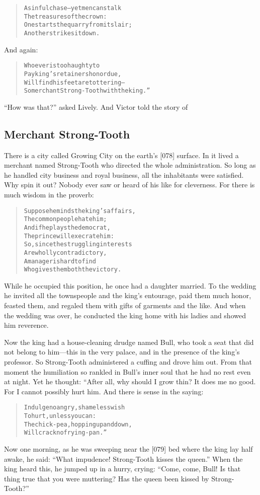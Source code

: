 \documentclass[article, twoside, 14pt]{memoir}
\renewenvironment{verbatim}{%
\begin{quote}%
\vskip -10pt%
\begin{alltt}\normalfont\large}{\end{alltt}%
\end{quote}%
\vskip -10pt
} %
\begin{document}
\begin{verbatim}
A sinful chase--yet men can stalk
    The treasures of the crown:
One starts the quarry from its lair;
    Another strikes it down.
\end{verbatim}
And again:

\begin{verbatim}
Whoever is too haughty to
Pay king's retainers honor due,
Will find his feet are tottering--
So merchant Strong-Tooth with the king.”
\end{verbatim}
``How was that?'' asked Lively. And Victor told the story of

\subsection{Merchant Strong-Tooth}

\label{s4}

There is a city called Growing City on the earth's [078] surface.
In it lived a merchant named Strong-Tooth who directed the whole
administration. So long as he handled city business and royal
business, all the inhabitants were satisfied. Why spin it out?
Nobody ever saw or heard of his like for cleverness. For there is
much wisdom in the proverb:

\begin{verbatim}
Suppose he minds the king's affairs,
    The common people hate him;
And if he plays the democrat,
    The prince will execrate him:
So, since the struggling interests
    Are wholly contradictory,
A manager is hard to find
    Who gives them both the victory.
\end{verbatim}
While he occupied this position, he once had a daughter married. To
the wedding he invited all the townspeople and the king's
entourage, paid them much honor, feasted them, and regaled them
with gifts of garments and the like. And when the wedding was over,
he conducted the king home with his ladies and showed him
reverence.

Now the king had a house-cleaning drudge named Bull, who took a
seat that did not belong to him---this in the very palace, and in
the presence of the king's professor. So Strong-Tooth administered
a cuffing and drove him out. From that moment the humiliation so
rankled in Bull's inner soul that he had no rest even at night. Yet
he thought: “After all, why should I grow thin? It does me no good.
For I cannot possibly hurt him. And there is sense in the saying:

\begin{verbatim}
Indulge no angry, shameless wish
    To hurt, unless you can:
The chick-pea, hopping up and down,
    Will crack no frying-pan.”
\end{verbatim}
Now one morning, as he was sweeping near the [079] bed where the
king lay half awake, he said:
``What impudence! Strong-Tooth kisses the queen.'' When the king
heard this, he jumped up in a hurry, crying:
``Come, come, Bull! Is that thing true that you were muttering? Has the queen been kissed by Strong-Tooth?''
\end{document}
